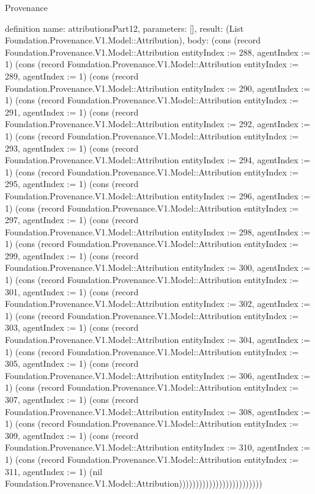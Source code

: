 \begin{lexlean}{Provenance}
\begin{semanticmodule}
definition{
  name: attributionsPart12,
  parameters: [],
  result: (List Foundation.Provenance.V1.Model::Attribution),
  body: (cons (record Foundation.Provenance.V1.Model::Attribution {entityIndex := 288, agentIndex := 1}) (cons (record Foundation.Provenance.V1.Model::Attribution {entityIndex := 289, agentIndex := 1}) (cons (record Foundation.Provenance.V1.Model::Attribution {entityIndex := 290, agentIndex := 1}) (cons (record Foundation.Provenance.V1.Model::Attribution {entityIndex := 291, agentIndex := 1}) (cons (record Foundation.Provenance.V1.Model::Attribution {entityIndex := 292, agentIndex := 1}) (cons (record Foundation.Provenance.V1.Model::Attribution {entityIndex := 293, agentIndex := 1}) (cons (record Foundation.Provenance.V1.Model::Attribution {entityIndex := 294, agentIndex := 1}) (cons (record Foundation.Provenance.V1.Model::Attribution {entityIndex := 295, agentIndex := 1}) (cons (record Foundation.Provenance.V1.Model::Attribution {entityIndex := 296, agentIndex := 1}) (cons (record Foundation.Provenance.V1.Model::Attribution {entityIndex := 297, agentIndex := 1}) (cons (record Foundation.Provenance.V1.Model::Attribution {entityIndex := 298, agentIndex := 1}) (cons (record Foundation.Provenance.V1.Model::Attribution {entityIndex := 299, agentIndex := 1}) (cons (record Foundation.Provenance.V1.Model::Attribution {entityIndex := 300, agentIndex := 1}) (cons (record Foundation.Provenance.V1.Model::Attribution {entityIndex := 301, agentIndex := 1}) (cons (record Foundation.Provenance.V1.Model::Attribution {entityIndex := 302, agentIndex := 1}) (cons (record Foundation.Provenance.V1.Model::Attribution {entityIndex := 303, agentIndex := 1}) (cons (record Foundation.Provenance.V1.Model::Attribution {entityIndex := 304, agentIndex := 1}) (cons (record Foundation.Provenance.V1.Model::Attribution {entityIndex := 305, agentIndex := 1}) (cons (record Foundation.Provenance.V1.Model::Attribution {entityIndex := 306, agentIndex := 1}) (cons (record Foundation.Provenance.V1.Model::Attribution {entityIndex := 307, agentIndex := 1}) (cons (record Foundation.Provenance.V1.Model::Attribution {entityIndex := 308, agentIndex := 1}) (cons (record Foundation.Provenance.V1.Model::Attribution {entityIndex := 309, agentIndex := 1}) (cons (record Foundation.Provenance.V1.Model::Attribution {entityIndex := 310, agentIndex := 1}) (cons (record Foundation.Provenance.V1.Model::Attribution {entityIndex := 311, agentIndex := 1}) (nil Foundation.Provenance.V1.Model::Attribution)))))))))))))))))))))))))
}


\end{semanticmodule}
\end{lexlean}
